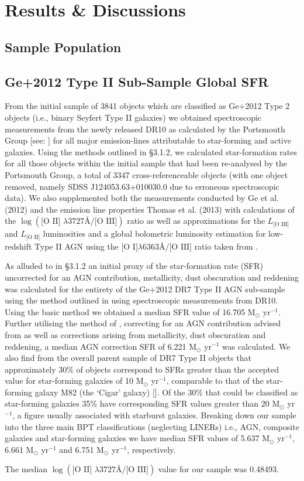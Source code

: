\section{Results \& Discussions}
\subsection{Sample Population}
\subsection{Ge+2012 Type II Sub-Sample Global SFR}

From the initial sample of 3841 objects which are classified as Ge+2012 Type 2 objects (i.e., binary Seyfert Type II galaxies) we obtained spectroscopic measurements from the newly released DR10 as calculated by the Portsmouth Group [see: \cite{Thomas_2013}] for all major emission-lines attributable to star-forming and active galaxies. Using the methods outlined in §3.1.2, we calculated star-formation rates for all those objects within the initial sample that had been re-analysed by the Portsmouth Group, a total of 3347 cross-referenceable objects (with one object removed, namely SDSS J124053.63+010030.0 due to erroneous spectroscopic data). We also supplemented both the measurements conducted by Ge et al. (2012) and the emission line properties Thomas et al. (2013) with calculations of the $\log{(\text{[O II] }{\lambda}3727Å\text{/[O III]})}$ ratio as well as approximations for the $L_{\text{[O III]}}$ and $L_{\text{[O II]}}$ luminosities and a global bolometric luminosity estimation for low-redshift Type II AGN using the $\text{[O I]}\lambda6363Å/\text{[O III]}$ ratio taken from \cite{Netzer_2009}.         

As alluded to in §3.1.2 an initial proxy of the star-formation rate (SFR) uncorrected for an AGN contribution, metallicity, dust obscuration and reddening was calculated for the entirety of the Ge+2012 DR7 Type II AGN sub-sample using the method outlined in \cite{Kennicutt_1998} using spectroscopic measurements from DR10. Using the basic \cite{Kennicutt_1998} method we obtained a median SFR value of 16.705 M$_{\odot}$ yr$^{-1}$. Further utilising the method of \cite{Kewley_2004}, correcting for an AGN contribution advised from \cite{2006ApJ...642..702K} as well as corrections arising from metallicity, dust obscuration and reddening, a median AGN correction SFR of 6.221 M$_{\odot}$ yr$^{-1}$ was calculated. We also find from the overall parent sample of DR7 Type II objects that approximately 30\% of objects correspond to SFRs greater than the accepted value for star-forming galaxies of 10 M$_{\odot}$ yr$^{-1}$, comparable to that of the star-forming galaxy M82 (the ‘Cigar’ galaxy) [\cite{2009ApJ...706.1364F}]. Of the 30\% that could be classified as star-forming galaxies 35\% have corresponding SFR values greater than 20 M$_{\odot}$ yr$^{-1}$, a figure usually associated with starburst galaxies. Breaking down our sample into the three main BPT classifications (neglecting LINERs) i.e., AGN, composite galaxies and star-forming galaxies we have median SFR values of 5.637 M$_{\odot}$ yr$^{-1}$, 6.661 M$_{\odot}$ yr$^{-1}$ and 6.751 M$_{\odot}$ yr$^{-1}$, respectively.    

The median $\log{(\text{[O II] }{\lambda}3727Å\text{/[O III]})}$ value for our sample was 0.48493. 


